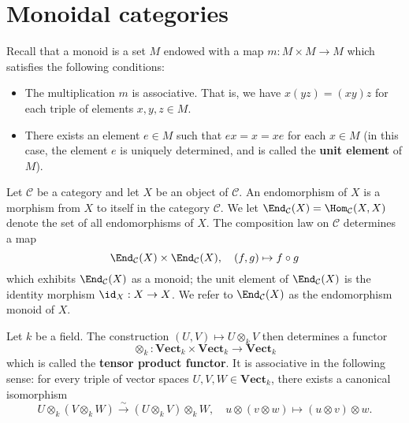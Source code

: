 \section{Monoidal categories}
Recall that a monoid is a set $M$ endowed with a map $m:M\times M\to M$ which satisfies the following conditions:
\begin{itemize}
\item The multiplication $m$ is associative. That is, we have $x(yz)=(xy)z$ for each triple of elements $x,y,z\in M$.
\item There exists an element $e\in M$ such that $ex=x=xe$ for each $x\in M$ (in this case, the element $e$ is uniquely determined, and is called the \textbf{unit element} of $M$).
\end{itemize}
\begin{example}
Let $\mathcal{C}$ be a category and let $X$ be an object of $\mathcal{C}$. An endomorphism of $X$ is a morphism from $X$ to itself in the category $\mathcal{C}$. We let $\End_{\mathcal{C}}(X)=\Hom_{\mathcal{C}}(X,X)$ denote the set of all endomorphisms of $X$. The composition law on $\mathcal{C}$ determines a map
\[\End_{\mathcal{C}}(X)\times\End_{\mathcal{C}}(X),\quad (f,g)\mapsto f\circ g\]
which exhibits $\End_{\mathcal{C}}(X)$ as a monoid; the unit element of $\End_{\mathcal{C}}(X)$ is the identity morphism $\id_X:X\to X$. We refer to $\End_{\mathcal{C}}(X)$ as the endomorphism monoid of $X$.
\end{example}
\begin{example}\label{monoidal cat Vect_k eg}
Let $k$ be a field. The construction $(U,V)\mapsto U\otimes_kV$ then determines a functor
\[\otimes_k:\mathbf{Vect}_k\times\mathbf{Vect}_k\to\mathbf{Vect}_k\]
which is called the \textbf{tensor product functor}. It is associative in the following sense: for every triple of vector spaces $U,V,W\in\mathbf{Vect}_k$, there exists a canonical isomorphism
\[U\otimes_k(V\otimes_kW)\stackrel{\sim}{\to}(U\otimes_kV)\otimes_kW,\quad u\otimes(v\otimes w)\mapsto(u\otimes v)\otimes w.\]
\end{example}

